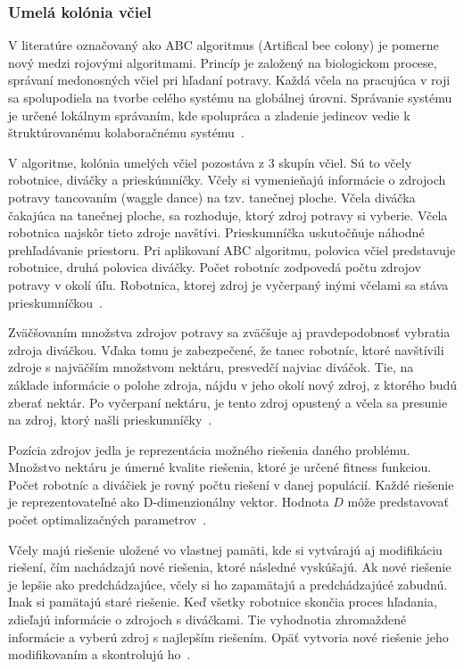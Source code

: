 \documentclass[a4paper,slovak,12pt,appendix]{article}
\begin{document}

\subsubsection{Umelá kolónia včiel}
V literatúre označovaný ako ABC algoritmus (Artifical bee colony) je pomerne
nový medzi rojovými algoritmami. Princíp je založený na biologickom procese,
správaní medonosných včiel pri hľadaní potravy. Každá včela na pracujúca
v roji sa spolupodiela na tvorbe celého systému na globálnej úrovni. Správanie
systému je určené lokálnym správaním, kde spolupráca a zladenie jedincov vedie
k štruktúrovanému kolaboračnému systému~\cite{Chavan2015}.

V algoritme, kolónia umelých včiel pozostáva z 3 skupín včiel. Sú to včely
robotnice, diváčky a prieskúmníčky. Včely si vymenieňajú informácie o zdrojoch
potravy tancovaním (waggle dance) na tzv. tanečnej ploche. Včela diváčka
čakajúca na tanečnej ploche, sa rozhoduje, ktorý zdroj potravy si vyberie.
Včela robotnica najskôr tieto zdroje navštívi. Prieskumníčka uskutočňuje
náhodné prehľadávanie priestoru. Pri aplikovaní ABC algoritmu, polovica včiel
predstavuje robotnice, druhá polovica diváčky. Počet robotníc zodpovedá počtu
zdrojov potravy v okolí úľu. Robotnica, ktorej zdroj je vyčerpaný inými
včelami sa stáva prieskumníčkou~\cite{Karaboga2007}.

Zväčšovaním množstva zdrojov potravy sa zväčšuje aj pravdepodobnosť vybratia
zdroja diváčkou. Vďaka tomu je zabezpečené, že tanec robotníc, ktoré navštívili
zdroje s najväčším množstvom nektáru, presvedčí najviac diváčok. Tie,
na základe informácie o polohe zdroja, nájdu v jeho okolí nový zdroj, z ktorého
budú zberať nektár. Po vyčerpaní nektáru, je tento zdroj opustený a včela sa
presunie na zdroj, ktorý našli prieskumníčky~\cite{Karaboga2007}.

Pozícia zdrojov jedla je reprezentácia možného riešenia daného problému.
Množstvo nektáru je úmerné kvalite riešenia, ktoré je určené fitness funkciou.
Počet robotníc a diváčiek je rovný počtu riešení v danej populácií. Každé
riešenie je reprezentovateľné ako D-dimenzionálny vektor. Hodnota $D$ môže
predstavovať počet optimalizačných parametrov~\cite{Karaboga2007}.

Včely majú riešenie uložené vo vlastnej pamäti, kde si vytvárajú aj modifikáciu
riešení, čím nachádzajú nové riešenia, ktoré následné vyskúšajú. Ak nové
riešenie je lepšie ako predchádzajúce, včely si ho zapamätajú a predchádzajúcé
zabudnú. Inak si pamätajú staré riešenie. Keď všetky robotnice skončia proces
hľadania, zdieľajú informácie o zdrojoch s diváčkami. Tie vyhodnotia
zhromaždené informácie a vyberú zdroj s najlepším riešením. Opäť vytvoria nové
riešenie jeho modifikovaním a skontrolujú ho~\cite{Karaboga2007}.
\end{document}
